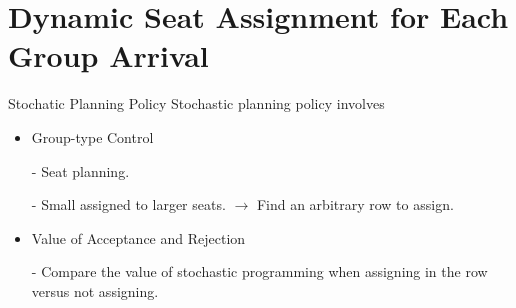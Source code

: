 
\section{Dynamic Seat Assignment for Each Group Arrival}
    \frame{\sectionpage}
    \begin{frame}{Stochatic Planning Policy}
      Stochastic planning policy involves
      \begin{itemize}
        \item Group-type Control
        \item[-] Seat planning.
        \item[-] Small assigned to larger seats. $\rightarrow$ Find an arbitrary row to assign.
        \item Value of Acceptance and Rejection
        \item[-] Compare the value of stochastic programming when assigning in the row versus not assigning.
      \end{itemize}
    \end{frame}



      
